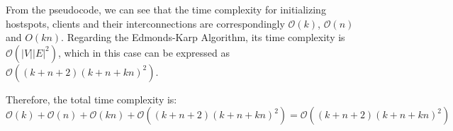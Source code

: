 \documentclass[12pt, a4paper]{article}
\begin{document}
From the pseudocode, we can see that the time complexity for initializing hostspots, 
clients and their interconnections are correspondingly $\mathcal{O}(k)$, $\mathcal{O}(n)$ and $O(kn)$. 
Regarding the Edmonds-Karp Algorithm, its time complexity is $\mathcal{O}(|V|{|E|}^2)$, which in this case can be expressed as 
$\mathcal{O}((k + n + 2)(k + n + kn)^2)$. 

Therefore, the total time complexity is:
$$\mathcal{O}(k) + \mathcal{O}(n) + \mathcal{O}(kn) + \mathcal{O}((k+n+2)(k+n+kn)^2) = \mathcal{O}((k+n+2)(k+n+kn)^2)$$
\end{document}
